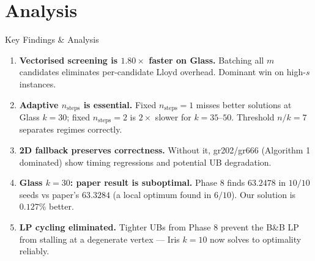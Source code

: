 \documentclass[aspectratio=169,12pt]{beamer}
\begin{document}
\section{Analysis}

\begin{frame}{Key Findings \& Analysis}
  \begin{enumerate}
    \item \textbf{Vectorised screening is $\mathbf{1.80\times}$ faster on Glass.}
      Batching all $m$ candidates eliminates per-candidate Lloyd overhead. Dominant win on high-$s$ instances.

    \vspace{0.3em}
    \item \textbf{Adaptive $n_\text{steps}$ is essential.}
      Fixed $n_\text{steps}=1$ misses better solutions at Glass $k=30$;
      fixed $n_\text{steps}=2$ is $2\times$ slower for $k=35$--$50$.
      Threshold $n/k=7$ separates regimes correctly.

    \vspace{0.3em}
    \item \textbf{2D fallback preserves correctness.}
      Without it, gr202/gr666 (Algorithm 1 dominated) show timing regressions and potential UB degradation.

    \vspace{0.3em}
    \item \textbf{Glass $k=30$: paper result is suboptimal.}
      Phase 8 finds $63.2478$ in $10/10$ seeds vs paper's $63.3284$ (a local optimum found in $6/10$). Our solution is $0.127\%$ better.

    \vspace{0.3em}
    \item \textbf{LP cycling eliminated.}
      Tighter UBs from Phase 8 prevent the B\&B LP from stalling at a degenerate vertex — Iris $k=10$ now solves to optimality reliably.
  \end{enumerate}
\end{frame}
\end{document}
